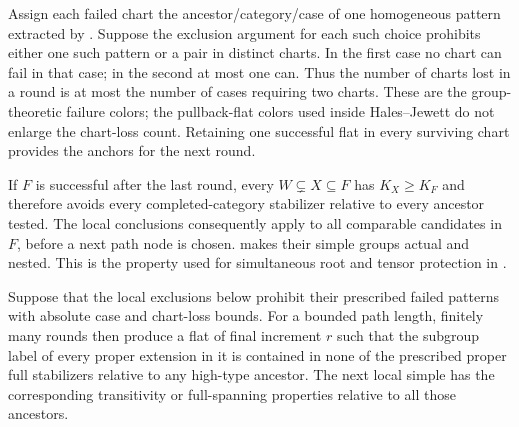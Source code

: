 

Assign each failed chart the ancestor/category/case of one homogeneous
pattern extracted by .
Suppose the exclusion argument for each such choice
prohibits either one such pattern or a pair in distinct charts. In the
first case no chart can fail in that case; in the second at most one can.
Thus the number of charts lost in a round is at most the number of cases
requiring two charts. These are the group-theoretic failure colors; the
pullback-flat colors used inside Hales--Jewett do not enlarge the
chart-loss count. Retaining one successful flat in every surviving chart
provides the anchors for the next round.

If $F$ is successful after the last round, every
$W\subsetneq X\subseteq F$ has $K_X\ge K_F$ and therefore avoids every
completed-category stabilizer relative to every ancestor tested.
The local conclusions consequently apply to all comparable candidates
in $F$, before a next path node is chosen.  makes
their simple groups actual and nested. This is the property used for
simultaneous root and tensor protection in .

\begin{proposition}\label{c:pruning-schedule}
Suppose that the local exclusions below prohibit their prescribed failed patterns with absolute case and chart-loss bounds. For a bounded path length, finitely many rounds then produce a flat of final increment \(r\) such that the subgroup label of every proper extension in it is contained in none of the prescribed proper full stabilizers relative to any high-type ancestor. The next local simple has the corresponding transitivity or full-spanning properties relative to all those ancestors.
\end{proposition}

